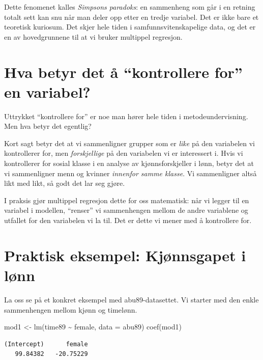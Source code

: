 \documentclass[
  norsk,
  letterpaper,
  DIV=11,
  numbers=noendperiod]{scrreprt}
\newenvironment{Shaded}{\begin{snugshade}}{\end{snugshade}}
\newcommand{\AttributeTok}[1]{\textcolor[rgb]{0.40,0.45,0.13}{#1}}
\newcommand{\FunctionTok}[1]{\textcolor[rgb]{0.28,0.35,0.67}{#1}}
\newcommand{\NormalTok}[1]{\textcolor[rgb]{0.00,0.23,0.31}{#1}}
\newcommand{\OtherTok}[1]{\textcolor[rgb]{0.00,0.23,0.31}{#1}}
\newcommand{\SpecialCharTok}[1]{\textcolor[rgb]{0.37,0.37,0.37}{#1}}
\theoremstyle{definition}
\theoremstyle{remark}
\begin{document}
Dette fenomenet kalles \emph{Simpsons paradoks}: en sammenheng som går i
en retning totalt sett kan snu når man deler opp etter en tredje
variabel. Det er ikke bare et teoretisk kuriosum. Det skjer hele tiden i
samfunnsvitenskapelige data, og det er en av hovedgrunnene til at vi
bruker multippel regresjon.

\section{Hva betyr det å ``kontrollere for'' en
variabel?}\label{hva-betyr-det-uxe5-kontrollere-for-en-variabel}

Uttrykket ``kontrollere for'' er noe man hører hele tiden i
metodeundervisning. Men hva betyr det egentlig?

Kort sagt betyr det at vi sammenligner grupper som er \emph{like} på den
variabelen vi kontrollerer for, men \emph{forskjellige} på den
variabelen vi er interessert i. Hvis vi kontrollerer for sosial klasse i
en analyse av kjønnsforskjeller i lønn, betyr det at vi sammenligner
menn og kvinner \emph{innenfor samme klasse}. Vi sammenligner altså likt
med likt, så godt det lar seg gjøre.

I praksis gjør multippel regresjon dette for oss matematisk: når vi
legger til en variabel i modellen, ``renser'' vi sammenhengen mellom de
andre variablene og utfallet for den variabelen vi la til. Det er dette
vi mener med å kontrollere for.

\section{Praktisk eksempel: Kjønnsgapet i
lønn}\label{praktisk-eksempel-kjuxf8nnsgapet-i-luxf8nn}

La oss se på et konkret eksempel med abu89-datasettet. Vi starter med
den enkle sammenhengen mellom kjønn og timelønn.

\begin{Shaded}
\begin{Highlighting}[]
\NormalTok{mod1 }\OtherTok{\textless{}{-}} \FunctionTok{lm}\NormalTok{(time89 }\SpecialCharTok{\textasciitilde{}}\NormalTok{ female, }\AttributeTok{data =}\NormalTok{ abu89)}
\FunctionTok{coef}\NormalTok{(mod1)}
\end{Highlighting}
\end{Shaded}

\begin{verbatim}
(Intercept)      female 
   99.84382   -20.75229 
\end{verbatim}
\end{document}
